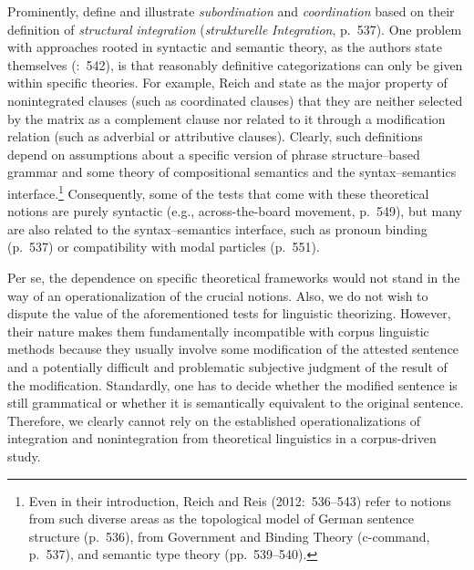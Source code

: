 Prominently, \citet{ReichReis2012} define and illustrate \textit{subordination} and \textit{coordination} based on their definition of \textit{structural} \textit{integration} (\textit{strukturelle} \textit{Integration}, p.~537). One problem with approaches rooted in syntactic and semantic theory, as the authors state themselves (\citealt{ReichReis2012}:~542), is that reasonably definitive categorizations can only be given within specific theories. For example, Reich and \citet[551]{Reis2012} state as the major property of nonintegrated clauses (such as coordinated clauses) that they are neither selected by the matrix as a complement clause nor related to it through a modification relation (such as adverbial or attributive clauses). Clearly, such definitions depend on assumptions about a specific version of phrase structure–based grammar and some theory of compositional semantics and the syntax–semantics interface.\footnote{Even in their introduction, Reich and Reis (2012:~536–543) refer to notions from such diverse areas as the topological model of German sentence structure (p.~536), from Government and Binding Theory (c-command, p.~537), and semantic type theory (pp.~539–540).} Consequently, some of the tests that come with these theoretical notions are purely syntactic (e.g., across-the-board movement, p.~549), but many are also related to the syntax–semantics interface, such as pronoun binding (p.~537) or compatibility with modal particles (p.~551).



Per se, the dependence on specific theoretical frameworks would not stand in the way of an operationalization of the crucial notions. Also, we do not wish to dispute the value of the aforementioned tests for linguistic theorizing. However, their nature makes them fundamentally incompatible with corpus linguistic methods because they usually involve some modification of the attested sentence and a potentially difficult and problematic subjective judgment of the result of the modification. Standardly, one has to decide whether the modified sentence is still grammatical or whether it is semantically equivalent to the original sentence. Therefore, we clearly cannot rely on the established operationalizations of integration and nonintegration from theoretical linguistics in a corpus-driven study.



